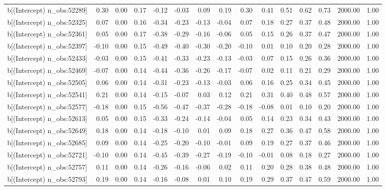 \begin{table}[ht]
\begin{tabular}{rrrrrrrrrrrrrrr}
  b[(Intercept) n\_obs:52289] & 0.30 & 0.00 & 0.17 & -0.12 & -0.03 & 0.09 & 0.19 & 0.30 & 0.41 & 0.51 & 0.62 & 0.73 & 2000.00 & 1.00 \\ 
  b[(Intercept) n\_obs:52325] & 0.07 & 0.00 & 0.16 & -0.34 & -0.23 & -0.13 & -0.04 & 0.07 & 0.18 & 0.27 & 0.37 & 0.48 & 2000.00 & 1.00 \\ 
  b[(Intercept) n\_obs:52361] & 0.05 & 0.00 & 0.17 & -0.38 & -0.29 & -0.16 & -0.06 & 0.05 & 0.15 & 0.26 & 0.37 & 0.47 & 2000.00 & 1.00 \\ 
  b[(Intercept) n\_obs:52397] & -0.10 & 0.00 & 0.15 & -0.49 & -0.40 & -0.30 & -0.20 & -0.10 & 0.01 & 0.10 & 0.20 & 0.28 & 2000.00 & 1.00 \\ 
  b[(Intercept) n\_obs:52433] & -0.03 & 0.00 & 0.15 & -0.41 & -0.33 & -0.23 & -0.13 & -0.03 & 0.07 & 0.15 & 0.26 & 0.36 & 2000.00 & 1.00 \\ 
  b[(Intercept) n\_obs:52469] & -0.07 & 0.00 & 0.14 & -0.44 & -0.36 & -0.26 & -0.17 & -0.07 & 0.02 & 0.11 & 0.21 & 0.29 & 2000.00 & 1.00 \\ 
  b[(Intercept) n\_obs:52505] & 0.06 & 0.00 & 0.14 & -0.31 & -0.23 & -0.13 & -0.03 & 0.06 & 0.16 & 0.25 & 0.34 & 0.45 & 2000.00 & 1.00 \\ 
  b[(Intercept) n\_obs:52541] & 0.21 & 0.00 & 0.14 & -0.15 & -0.07 & 0.03 & 0.12 & 0.21 & 0.31 & 0.40 & 0.48 & 0.57 & 2000.00 & 1.00 \\ 
  b[(Intercept) n\_obs:52577] & -0.18 & 0.00 & 0.15 & -0.56 & -0.47 & -0.37 & -0.28 & -0.18 & -0.08 & 0.01 & 0.10 & 0.20 & 2000.00 & 1.00 \\ 
  b[(Intercept) n\_obs:52613] & 0.05 & 0.00 & 0.15 & -0.33 & -0.24 & -0.14 & -0.04 & 0.05 & 0.14 & 0.23 & 0.34 & 0.43 & 2000.00 & 1.00 \\ 
  b[(Intercept) n\_obs:52649] & 0.18 & 0.00 & 0.14 & -0.18 & -0.10 & 0.01 & 0.09 & 0.18 & 0.27 & 0.36 & 0.47 & 0.58 & 2000.00 & 1.00 \\ 
  b[(Intercept) n\_obs:52685] & 0.09 & 0.00 & 0.14 & -0.25 & -0.20 & -0.10 & -0.01 & 0.09 & 0.19 & 0.27 & 0.37 & 0.46 & 2000.00 & 1.00 \\ 
  b[(Intercept) n\_obs:52721] & -0.10 & 0.00 & 0.14 & -0.45 & -0.39 & -0.27 & -0.19 & -0.10 & -0.01 & 0.08 & 0.18 & 0.27 & 2000.00 & 1.00 \\ 
  b[(Intercept) n\_obs:52757] & 0.11 & 0.00 & 0.14 & -0.26 & -0.16 & -0.06 & 0.02 & 0.11 & 0.20 & 0.28 & 0.38 & 0.48 & 2000.00 & 1.00 \\ 
  b[(Intercept) n\_obs:52793] & 0.19 & 0.00 & 0.14 & -0.16 & -0.08 & 0.01 & 0.10 & 0.19 & 0.29 & 0.37 & 0.47 & 0.59 & 2000.00 & 1.00 \\ 

\end{tabular}
\end{table}
